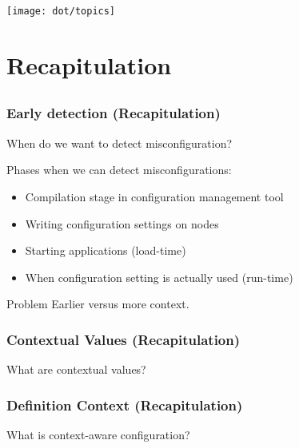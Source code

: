 \begin{frame}
	\hspace*{-1cm}\texttt{[image: dot/topics]}
\end{frame}

\section{Recapitulation}
\subsection{}

\begin{frame}
	\frametitle{Early detection (Recapitulation)}
	\begin{task}
	When do we want to detect misconfiguration?
	\end{task}

	\pause

	Phases when we can detect misconfigurations:
	\begin{itemize} %
	\item Compilation stage in configuration management tool
	\item Writing configuration settings on nodes
	\item Starting applications (load-time)
	\item When configuration setting is actually used (run-time)
	\end{itemize}

	\pause[\thebeamerpauses]

	\begin{alertblock}{Problem}
	Earlier versus more context.
	\end{alertblock}
\end{frame}

\begin{frame}
	\frametitle{Contextual Values (Recapitulation)}

	\begin{task}
	What are contextual values?
	\end{task}

	\pause

\end{frame}

\begin{frame}
	\frametitle{Definition Context (Recapitulation)}

	\begin{task}
	What is context-aware configuration?
	\end{task}

	\pause

\end{frame}

